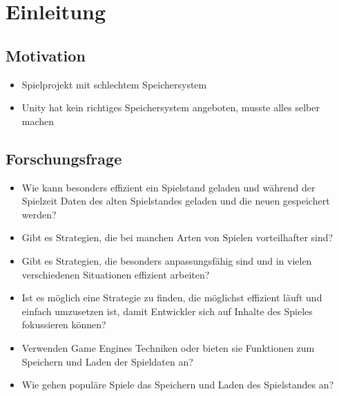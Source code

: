 \chapter{Einleitung}\label{ch:introduction}
\section{Motivation}
\begin{itemize}
    \item Spielprojekt mit schlechtem Speichersystem 
    \item Unity hat kein richtiges Speichersystem angeboten, musste alles selber machen
\end{itemize}

\section{Forschungsfrage}
\begin{itemize}
    \item Wie kann besonders effizient ein Spielstand geladen und während der Spielzeit Daten des alten Spielstandes geladen und die neuen gespeichert werden?
    \item Gibt es Strategien, die bei manchen Arten von Spielen vorteilhafter sind?
    \item Gibt es Strategien, die besonders anpassungsfähig sind und in vielen verschiedenen Situationen effizient arbeiten?
    \item Ist es möglich eine Strategie zu finden, die möglichst effizient läuft und einfach umzusetzen ist, damit Entwickler sich auf Inhalte des Spieles fokussieren können?
    \item Verwenden Game Engines Techniken oder bieten sie Funktionen zum Speichern und Laden der Spieldaten an?
    \item Wie gehen populäre Spiele das Speichern und Laden des Spielstandes an?
\end{itemize}


